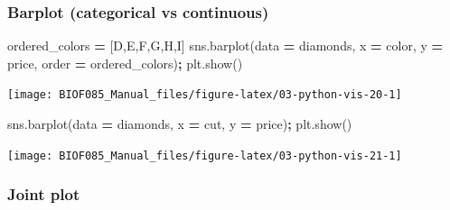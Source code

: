 \documentclass[
  letterpaper,
]{scrbook}
\newenvironment{Shaded}{\begin{snugshade}}{\end{snugshade}}
\newcommand{\NormalTok}[1]{#1}
\newcommand{\OperatorTok}[1]{\textcolor[rgb]{0.81,0.36,0.00}{\textbf{#1}}}
\newcommand{\StringTok}[1]{\textcolor[rgb]{0.31,0.60,0.02}{#1}}
\begin{document}
\hypertarget{barplot-categorical-vs-continuous}{%
\subsubsection{Barplot (categorical vs continuous)}\label{barplot-categorical-vs-continuous}}

\begin{Shaded}
\begin{Highlighting}[]
\NormalTok{ordered\_colors }\OperatorTok{=}\NormalTok{ [}\StringTok{\textquotesingle{}D\textquotesingle{}}\NormalTok{,}\StringTok{\textquotesingle{}E\textquotesingle{}}\NormalTok{,}\StringTok{\textquotesingle{}F\textquotesingle{}}\NormalTok{,}\StringTok{\textquotesingle{}G\textquotesingle{}}\NormalTok{,}\StringTok{\textquotesingle{}H\textquotesingle{}}\NormalTok{,}\StringTok{\textquotesingle{}I\textquotesingle{}}\NormalTok{]}
\NormalTok{sns.barplot(data }\OperatorTok{=}\NormalTok{ diamonds, x }\OperatorTok{=} \StringTok{\textquotesingle{}color\textquotesingle{}}\NormalTok{, y }\OperatorTok{=} \StringTok{\textquotesingle{}price\textquotesingle{}}\NormalTok{, order }\OperatorTok{=}\NormalTok{ ordered\_colors)}\OperatorTok{;}
\NormalTok{plt.show()}
\end{Highlighting}
\end{Shaded}

\begin{center}\texttt{[image: BIOF085\_Manual\_files/figure-latex/03-python-vis-20-1]} \end{center}

\begin{Shaded}
\begin{Highlighting}[]
\NormalTok{sns.barplot(data }\OperatorTok{=}\NormalTok{ diamonds, x }\OperatorTok{=} \StringTok{\textquotesingle{}cut\textquotesingle{}}\NormalTok{, y }\OperatorTok{=} \StringTok{\textquotesingle{}price\textquotesingle{}}\NormalTok{)}\OperatorTok{;}
\NormalTok{plt.show()}
\end{Highlighting}
\end{Shaded}

\begin{center}\texttt{[image: BIOF085\_Manual\_files/figure-latex/03-python-vis-21-1]} \end{center}

\hypertarget{joint-plot}{%
\subsubsection{Joint plot}\label{joint-plot}}
\end{document}
